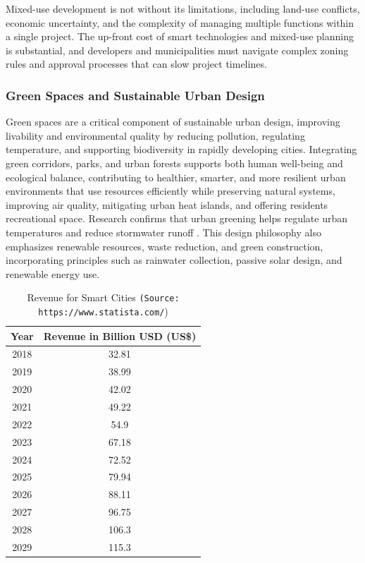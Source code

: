 \documentclass[journal]{IEEEtran}
\begin{document}
Mixed-use development is not without its limitations, including land-use conflicts, economic uncertainty, and the complexity of managing multiple functions within a single project. The up-front cost of smart technologies and mixed-use planning is substantial, and developers and municipalities must navigate complex zoning rules and approval processes that can slow project timelines.

\subsubsection{Green Spaces and Sustainable Urban Design}
Green spaces are a critical component of sustainable urban design, improving livability and environmental quality by reducing pollution, regulating temperature, and supporting biodiversity in rapidly developing cities. Integrating green corridors, parks, and urban forests supports both human well-being and ecological balance, contributing to healthier, smarter, and more resilient urban environments that use resources efficiently while preserving natural systems, improving air quality, mitigating urban heat islands, and offering residents recreational space. Research confirms that urban greening helps regulate urban temperatures and reduce stormwater runoff \cite{r63}. This design philosophy also emphasizes renewable resources, waste reduction, and green construction, incorporating principles such as rainwater collection, passive solar design, and renewable energy use.

\begin{table}[!t]
\caption{Revenue for Smart Cities 
\texttt{(Source: https://www.statista.com/})}
\label{tab:revenue}
\centering
\begin{tabular}{@{}cc@{}}
\toprule
\textbf{Year} & \textbf{Revenue in Billion USD (US\$)}\\
\midrule
2018 & 32.81\\
2019 & 38.99\\
2020 & 42.02\\
2021 & 49.22\\
2022 & 54.9\\
2023 & 67.18\\
2024 & 72.52\\
2025 & 79.94\\
2026 & 88.11\\
2027 & 96.75\\
2028 & 106.3\\
2029 & 115.3\\
\bottomrule
\end{tabular}
\end{table}
\end{document}
